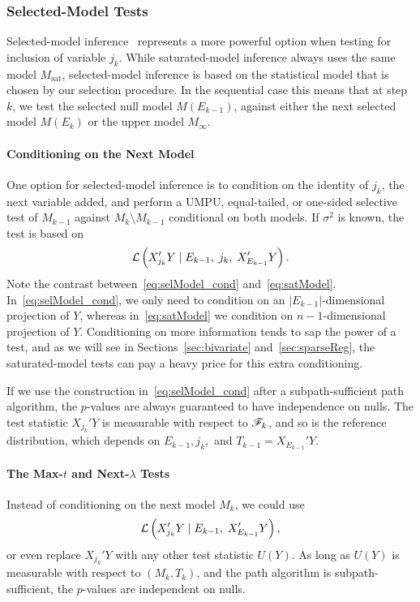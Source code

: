 \documentclass{article}
\begin{document}
\subsubsection{Selected-Model Tests}
Selected-model inference~\citep{fithian2014optimal} 
represents a more powerful option when testing for inclusion of variable $j_k$. While saturated-model inference always uses the same model $M_{\text{sat}}$, selected-model inference is based on the statistical model that is chosen by our selection procedure. In the sequential case this means that at step $k$, we test the selected null model $M(E_{k-1})$, against either the next selected model $M(E_k)$ or the upper model $M_\infty$.

\paragraph{Conditioning on the Next Model}
One option for selected-model inference is to condition on the identity of $j_k$, the next variable added, and perform a UMPU, equal-tailed, or one-sided selective test of $M_{k-1}$ against $M_{k}\setminus M_{k-1}$ conditional on both models. If $\sigma^2$ is known, the test is based on
\begin{equation}\label{eq:selModel_cond}
\mathcal{L}\left(X_{j_k}'Y \mid E_{k-1}, \; j_k, \; X_{E_{k-1}}'Y\right).
\end{equation}
Note the contrast between~\eqref{eq:selModel_cond} and~\eqref{eq:satModel}. In~\eqref{eq:selModel_cond}, we only need to condition on an $|E_{k-1}|$-dimensional projection of $Y$, whereas in~\eqref{eq:satModel} we condition on $n-1$-dimensional projection of $Y$. Conditioning on more information tends to sap the power of a test, and as we will see in Sections~\ref{sec:bivariate} and~\ref{sec:sparseReg}, the saturated-model tests can pay a heavy price for this extra conditioning.

If we use the construction in~\eqref{eq:selModel_cond} after a subpath-sufficient path algorithm, the $p$-values are always guaranteed to have independence on nulls. The test statistic $X_{j_k}'Y$ is measurable with respect to $\mathscr{F}_k$, and so is the reference distribution, which depends on $E_{k-1}, j_k,$ and $T_{k-1} = X_{E_{k-1}}'Y$.

\paragraph{The Max-$t$ and Next-$\lambda$ Tests}
Instead of conditioning on the next model $M_k$, we could use
\begin{equation}\label{eq:selModel_marg}
\mathcal{L}\left(X_{j_k}'Y \mid E_{k-1}, \; X_{E_{k-1}}'Y\right),
\end{equation}
or even replace $X_{j_k}'Y$ with any other test statistic $U(Y)$. As long as $U(Y)$ is measurable with respect to $(M_k, T_k)$, and the path algorithm is subpath-sufficient, the $p$-values are independent on nulls.
\end{document}
